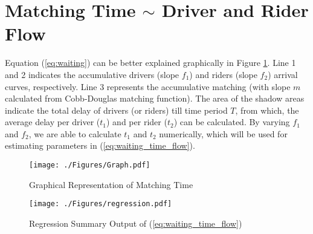 \section{Matching Time $\sim$ Driver and Rider Flow}\label{app:explain}

Equation (\ref{eq:waiting}) can be better explained graphically in Figure \ref{fig:match_time}. Line 1 and 2 indicates the accumulative drivers (slope $f_{1}$) and riders (slope $f_{2}$) arrival curves, respectively. Line 3 represents the accumulative matching (with slope $m$ calculated from Cobb-Douglas matching function). The area of the shadow areas indicate the total delay of drivers (or riders) till time period $T$, from which, the average delay per driver ($t_1$) and per rider ($t_2$) can be calculated. By varying $f_1$ and $f_2$, we are able to calculate $t_1$ and $t_2$ numerically, which will be used for estimating parameters in (\ref{eq:waiting_time_flow}). 
\begin{figure}[htbp]
\begin{center}
    \texttt{[image: ./Figures/Graph.pdf]}
    \vspace{-1cm}
\caption{Graphical Representation of Matching Time}
\label{fig:match_time}
\end{center}
\end{figure}


\begin{figure}[htbp]
\begin{center}
    \texttt{[image: ./Figures/regression.pdf]}
\caption{Regression Summary Output of (\ref{eq:waiting_time_flow})}
\label{fig:regression_output}
\end{center}
\end{figure}
